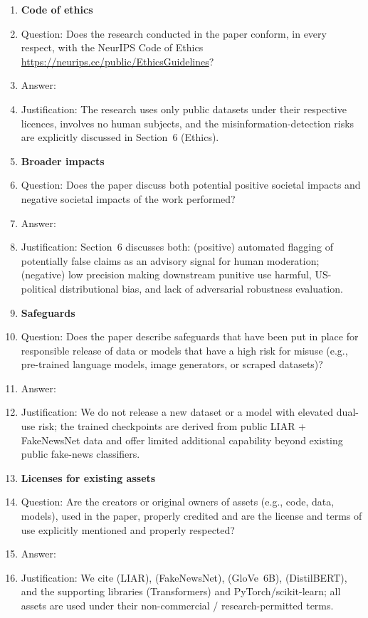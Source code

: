 \begin{enumerate}
\item {\bf Code of ethics}
    \item[] Question: Does the research conducted in the paper conform, in every respect, with the NeurIPS Code of Ethics \url{https://neurips.cc/public/EthicsGuidelines}?
    \item[] Answer: \answerYes{}
    \item[] Justification: The research uses only public datasets under their respective licences, involves no human subjects, and the misinformation-detection risks are explicitly discussed in Section~6 (Ethics).

\item {\bf Broader impacts}
    \item[] Question: Does the paper discuss both potential positive societal impacts and negative societal impacts of the work performed?
    \item[] Answer: \answerYes{}
    \item[] Justification: Section~6 discusses both: (positive) automated flagging of potentially false claims as an advisory signal for human moderation; (negative) low precision making downstream punitive use harmful, US-political distributional bias, and lack of adversarial robustness evaluation.

\item {\bf Safeguards}
    \item[] Question: Does the paper describe safeguards that have been put in place for responsible release of data or models that have a high risk for misuse (e.g., pre-trained language models, image generators, or scraped datasets)?
    \item[] Answer: \answerNA{}
    \item[] Justification: We do not release a new dataset or a model with elevated dual-use risk; the trained checkpoints are derived from public LIAR + FakeNewsNet data and offer limited additional capability beyond existing public fake-news classifiers.

\item {\bf Licenses for existing assets}
    \item[] Question: Are the creators or original owners of assets (e.g., code, data, models), used in the paper, properly credited and are the license and terms of use explicitly mentioned and properly respected?
    \item[] Answer: \answerYes{}
    \item[] Justification: We cite \citet{wang2017liar} (LIAR), \citet{shu2020fakenewsnet} (FakeNewsNet), \citet{pennington2014glove} (GloVe~6B), \citet{sanh2019distilbert} (DistilBERT), and the supporting libraries \citet{wolf2020transformers} (Transformers) and PyTorch/scikit-learn; all assets are used under their non-commercial / research-permitted terms.


\end{enumerate}

